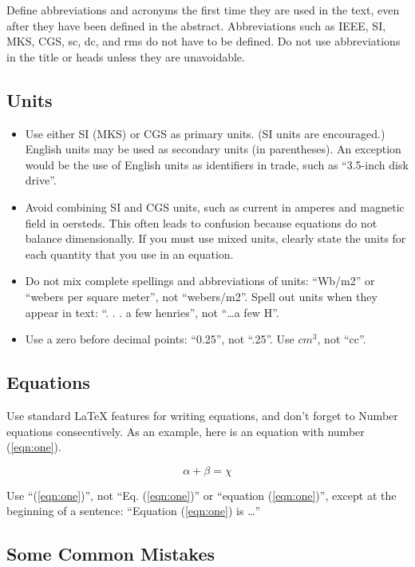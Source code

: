 \documentclass{MIPRO}
\begin{document}
Define abbreviations and acronyms the first time they are used in the text, even after they have been defined in the abstract. Abbreviations such as IEEE, SI, MKS, CGS, sc, dc, and rms do not have to be defined. Do not use abbreviations in the title or heads unless they are unavoidable.

\subsection{Units}

\begin{itemize}
	\item	Use either SI (MKS) or CGS as primary units. (SI units are encouraged.) English units may be used as secondary units (in parentheses). An exception would be the use of English units as identifiers in trade, such as “3.5-inch disk drive”.
	\item	Avoid combining SI and CGS units, such as current in amperes and magnetic field in oersteds. This often leads to confusion because equations do not balance dimensionally. If you must use mixed units, clearly state the units for each quantity that you use in an equation.
	\item	Do not mix complete spellings and abbreviations of units: “Wb/m2” or “webers per square meter”, not “webers/m2”.  Spell out units when they appear in text: “. . . a few henries”, not “\ldots a few H”.
	\item	Use a zero before decimal points: “0.25”, not “.25”. Use $cm^3$, not “cc”.
\end{itemize}

\subsection{Equations}

Use standard \LaTeX{} features for writing equations, and don't forget to Number equations consecutively. As an example, here is an equation with number (\ref{eqn:one}).

\begin{equation}
	\label{eqn:one}
	\alpha + \beta = \chi
\end{equation}

Use “(\ref{eqn:one})”, not “Eq. (\ref{eqn:one})” or “equation (\ref{eqn:one})”, except at the beginning of a sentence: “Equation (\ref{eqn:one}) is \ldots”

\subsection{Some Common Mistakes}
\end{document}
